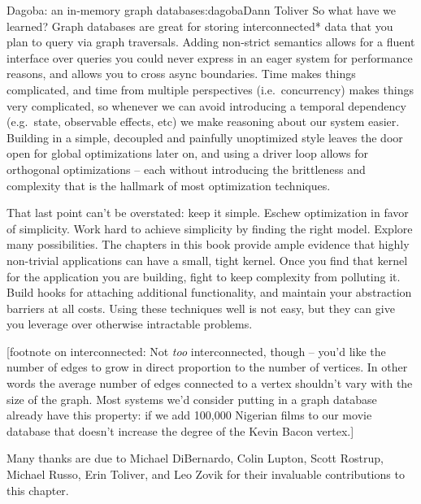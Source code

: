 \begin{aosachapter}{Dagoba: an in-memory graph database}{s:dagoba}{Dann Toliver}
So what have we learned? Graph databases are great for storing
interconnected* data that you plan to query via graph traversals. Adding
non-strict semantics allows for a fluent interface over queries you
could never express in an eager system for performance reasons, and
allows you to cross async boundaries. Time makes things complicated, and
time from multiple perspectives (i.e.~concurrency) makes things very
complicated, so whenever we can avoid introducing a temporal dependency
(e.g.~state, observable effects, etc) we make reasoning about our system
easier. Building in a simple, decoupled and painfully unoptimized style
leaves the door open for global optimizations later on, and using a
driver loop allows for orthogonal optimizations -- each without
introducing the brittleness and complexity that is the hallmark of most
optimization techniques.

That last point can't be overstated: keep it simple. Eschew optimization
in favor of simplicity. Work hard to achieve simplicity by finding the
right model. Explore many possibilities. The chapters in this book
provide ample evidence that highly non-trivial applications can have a
small, tight kernel. Once you find that kernel for the application you
are building, fight to keep complexity from polluting it. Build hooks
for attaching additional functionality, and maintain your abstraction
barriers at all costs. Using these techniques well is not easy, but they
can give you leverage over otherwise intractable problems.

{[}footnote on interconnected: Not \emph{too} interconnected, though --
you'd like the number of edges to grow in direct proportion to the
number of vertices. In other words the average number of edges connected
to a vertex shouldn't vary with the size of the graph. Most systems we'd
consider putting in a graph database already have this property: if we
add 100,000 Nigerian films to our movie database that doesn't increase
the degree of the Kevin Bacon vertex.{]}

\label{acknowledgements}

Many thanks are due to Michael DiBernardo, Colin Lupton, Scott Rostrup,
Michael Russo, Erin Toliver, and Leo Zovik for their invaluable
contributions to this chapter.

\end{aosachapter}
